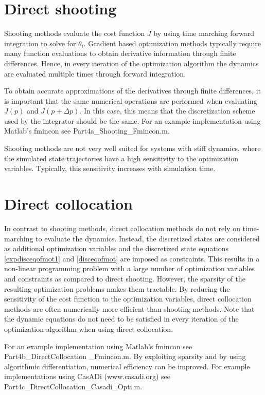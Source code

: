\documentclass[
a4paper, %
11pt, %
onecolumn, %
openright, %
]{memoir}
\begin{document}
\section{Direct shooting}

Shooting methods evaluate the cost function $J$ by using time marching forward integration to solve for $\theta_i$. Gradient based optimization methods typically require many function evaluations to obtain derivative information through finite differences. Hence, in every iteration of the optimization algorithm the dynamics are evaluated multiple times through forward integration. 

To obtain accurate approximations of the derivatives through finite differences, it is important that the same numerical operations are performed when evaluating $J(p)$ and $J(p+\Delta p)$. In this case, this means that the discretization scheme used by the integrator should be the same. For an example implementation using Matlab's fmincon see Part4a\_Shooting\_Fmincon.m.

Shooting methods are not very well suited for systems with stiff dynamics, where the simulated state trajectories have a high sensitivity to the optimization variables. Typically, this sensitivity increases with simulation time.

\section{Direct collocation}

In contrast to shooting methods, direct collocation methods do not rely on time-marching to evaluate the dynamics. Instead, the discretized states are considered as additional optimization variables and the discretized state equations \ref{expdisceqofmot1} and \ref{disceqofmot} are imposed as constraints. This results in a non-linear programming problem with a large number of optimization variables and constraints as compared to direct shooting. However, the sparsity of the resulting optimization problems makes them tractable. By reducing the sensitivity of the cost function to the optimization variables, direct collocation methods are often numerically more efficient than shooting methods. Note that the dynamic equations do not need to be satisfied in every iteration of the optimization algorithm when using direct collocation. 

For an example implementation using Matlab's fmincon see Part4b\_DirectCollocation  \_Fmincon.m. By exploiting sparsity and by using algorithmic differentiation, numerical efficiency can be improved. For example implementations using CasADi (www.casadi.org) see Part4c\_DirectCollocation\_Casadi\_Opti.m.
\end{document}
